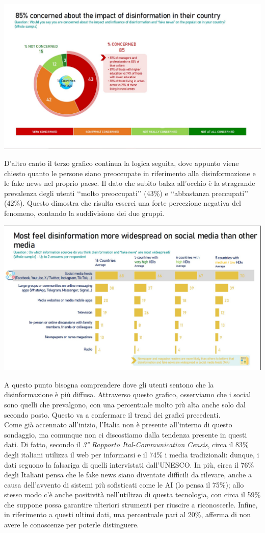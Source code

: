 \documentclass{article}
\begin{document}
\begin{justify}
\begin{center}
\includegraphics[width=0.6\linewidth]{Immagini/Grafico3.jpg}
\end{center}
    D'altro canto il terzo grafico continua la logica seguita, dove appunto viene chiesto quanto le persone siano preoccupate in riferimento alla disinformazione e le fake news nel proprio paese.
    Il dato che subito balza all'occhio è la stragrande prevalenza degli utenti ‘‘molto preoccupati’’ (43\%) e ‘‘abbastanza preccupati’’ (42\%). Questo dimostra che risulta esserci una forte percezione negativa del fenomeno, contando la suddivisione dei due gruppi.

\begin{center}
\includegraphics[width=0.6\linewidth]{Immagini/Grafico4.jpg}
\end{center}
    A questo punto bisogna comprendere dove gli utenti sentono che la disinformazione è più diffusa. Attraverso questo grafico, osserviamo che i social sono quelli che prevalgono, con una percentuale molto più alta anche solo dal secondo posto. Questo va a confermare il trend dei grafici precedenti.\\
    Come già accennato all'inizio, l'Italia non è presente all'interno di questo sondaggio, ma comunque non ci discostiamo dalla tendenza presente in questi dati.
    Di fatto, secondo il \textit{3° Rapporto Ital-Communication Censis}, circa il 83\% degli italiani utilizza il web per informarsi e il 74\% i media tradizionali: dunque, i dati seguono la falsariga di quelli intervistati dall'UNESCO.
    In più, circa il 76\% degli Italiani pensa che le fake news siano diventate difficili da rilevare, anche a causa dell'avvento di sistemi più sofisticati come le AI (lo pensa il 75\%); allo stesso modo c'è anche positività nell'utilizzo di questa tecnologia, con circa il 59\% che suppone possa garantire ulteriori strumenti per riuscire a riconoscerle.
    Infine, in riferimento a questi ultimi dati, una percentuale pari al 20\%, afferma di non avere le conoscenze per poterle distinguere.\citep{chiariello_disinformazione_2023}
\end{justify}
\end{document}
